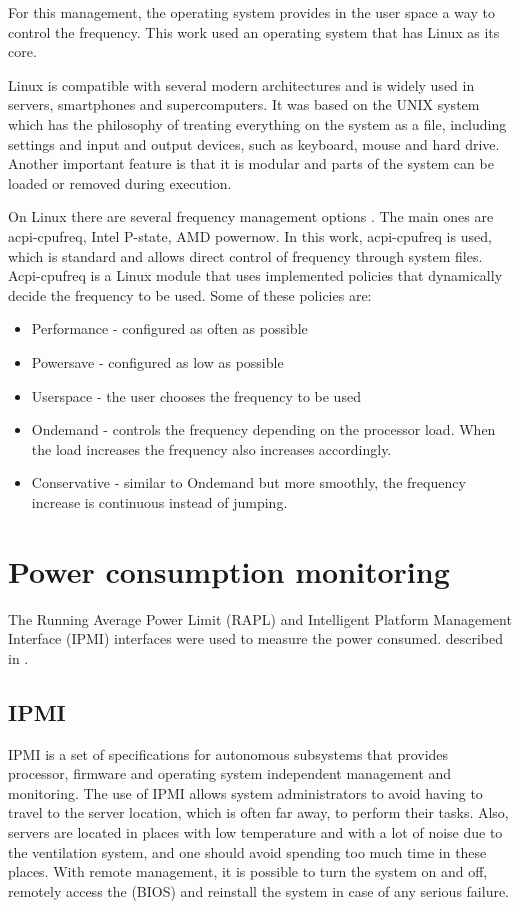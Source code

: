 
For this management, the operating system provides in the user space a way to control the frequency. This work used an operating system that has Linux as its core.

Linux is compatible with several modern architectures and is widely used in servers, smartphones and supercomputers. It was based on the UNIX system which has the philosophy of treating everything on the system as a file, including settings and input and output devices, such as keyboard, mouse and hard drive. Another important feature is that it is modular and parts of the system can be loaded or removed during execution.

On Linux there are several frequency management options \cite {Brown2005}. The main ones are acpi-cpufreq, Intel P-state, AMD powernow. In this work, acpi-cpufreq is used, which is standard and allows direct control of frequency through system files. Acpi-cpufreq is a Linux module that uses implemented policies that dynamically decide the frequency to be used. Some of these policies are:

\begin {itemize}
\item Performance - configured as often as possible
\item Powersave - configured as low as possible
\item Userspace - the user chooses the frequency to be used
\item Ondemand - controls the frequency depending on the processor load. When the load increases the frequency also increases accordingly.
\item Conservative - similar to Ondemand but more smoothly, the frequency increase is continuous instead of jumping.
\end {itemize}

\section {Power consumption monitoring} \label {sec: monitoring}
The Running Average Power Limit (RAPL) and Intelligent Platform Management Interface (IPMI) interfaces were used to measure the power consumed. described in \cite{November2013}.

\subsection {IPMI}
IPMI \cite {November2013} is a set of specifications for autonomous subsystems that provides processor, firmware and operating system independent management and monitoring. The use of IPMI allows system administrators to avoid having to travel to the server location, which is often far away, to perform their tasks. Also, servers are located in places with low temperature and with a lot of noise due to the ventilation system, and one should avoid spending too much time in these places. With remote management, it is possible to turn the system on and off, remotely access the (BIOS) and reinstall the system in case of any serious failure.

